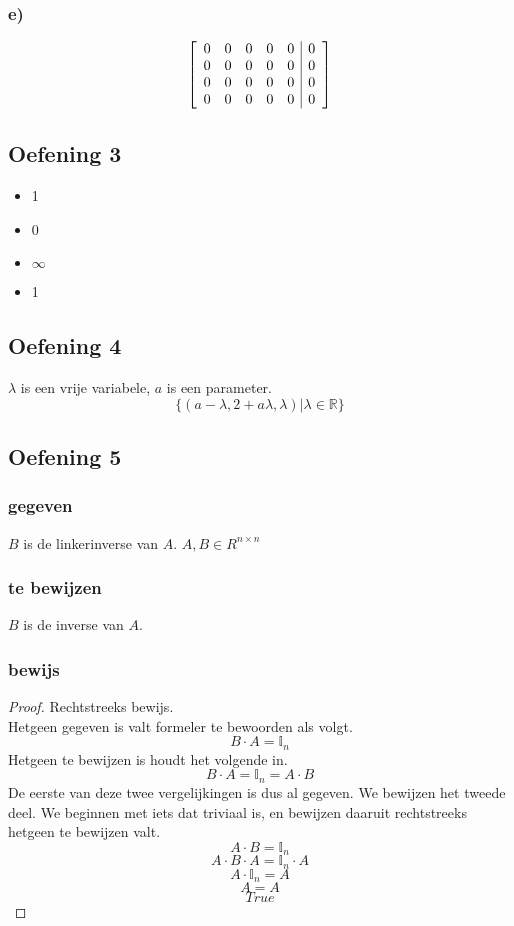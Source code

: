 \documentclass[lineaire_algebra_oplossingen.tex]{subfiles}
\begin{document}
\subsubsection*{e)}
\[
\left[
\begin{array}{l l l l l | r}
0 & 0 & 0 & 0 & 0 & 0\\
0 & 0 & 0 & 0 & 0 & 0\\
0 & 0 & 0 & 0 & 0 & 0\\
0 & 0 & 0 & 0 & 0 & 0\\
\end{array}
\right]
\]

\subsection{Oefening 3}
\begin{itemize}
\item 1
\item 0
\item $\infty$
\item 1
\end{itemize}

\subsection{Oefening 4}
$\lambda$ is een vrije variabele, $a$ is een parameter.
\[
\{(a-\lambda, 2+a\lambda, \lambda) | \lambda \in \mathbb{R}\}
\]

\subsection{Oefening 5}
\subsubsection*{gegeven}
$B$ is de linkerinverse van $A$. $A,B \in R^{n\times n}$
\subsubsection*{te bewijzen}
$B$ is de inverse van $A$.
\subsubsection*{bewijs}
\begin{proof}
Rechtstreeks bewijs.\\
Hetgeen gegeven is valt formeler te bewoorden als volgt.
\[
B\cdot A = \mathbb{I}_n
\]
Hetgeen te bewijzen is houdt het volgende in.
\[
B\cdot A = \mathbb{I}_n = A \cdot B
\]
De eerste van deze twee vergelijkingen is dus al gegeven.
We bewijzen het tweede deel. We beginnen met iets dat triviaal is, en bewijzen daaruit rechtstreeks hetgeen te bewijzen valt.\\
\[A\cdot B = \mathbb{I}_n\]
\[A\cdot B \cdot A = \mathbb{I}_n \cdot A\]
\[A\cdot\mathbb{I}_n = A\]
\[A = A\]
\[True\]
\end{proof}
\end{document}
